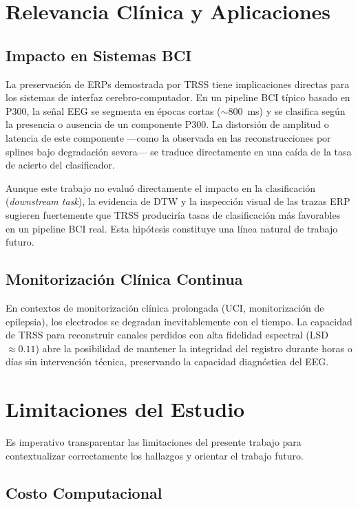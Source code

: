 \section{Relevancia Clínica y Aplicaciones}

\subsection{Impacto en Sistemas BCI}

La preservación de ERPs demostrada por TRSS tiene implicaciones directas para los sistemas de interfaz cerebro-computador. En un pipeline BCI típico basado en P300, la señal EEG se segmenta en épocas cortas ($\sim$800~ms) y se clasifica según la presencia o ausencia de un componente P300. La distorsión de amplitud o latencia de este componente ---como la observada en las reconstrucciones por splines bajo degradación severa--- se traduce directamente en una caída de la tasa de acierto del clasificador.

Aunque este trabajo no evaluó directamente el impacto en la clasificación (\textit{downstream task}), la evidencia de DTW y la inspección visual de las trazas ERP sugieren fuertemente que TRSS produciría tasas de clasificación más favorables en un pipeline BCI real. Esta hipótesis constituye una línea natural de trabajo futuro.

\subsection{Monitorización Clínica Continua}

En contextos de monitorización clínica prolongada (UCI, monitorización de epilepsia), los electrodos se degradan inevitablemente con el tiempo. La capacidad de TRSS para reconstruir canales perdidos con alta fidelidad espectral (LSD $\approx 0.11$) abre la posibilidad de mantener la integridad del registro durante horas o días sin intervención técnica, preservando la capacidad diagnóstica del EEG.

\section{Limitaciones del Estudio}

Es imperativo transparentar las limitaciones del presente trabajo para contextualizar correctamente los hallazgos y orientar el trabajo futuro.

\subsection{Costo Computacional}

